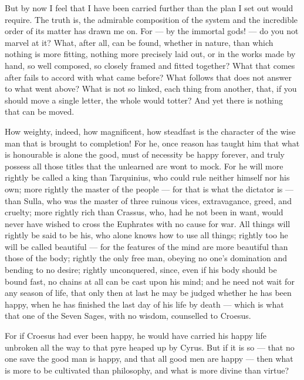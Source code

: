  But by now I feel that I have been carried further than the plan I set out would require. The truth is, the admirable composition of the system and the incredible order of its matter has drawn me on. For — by the immortal gods! — do you not marvel at it? What, after all, can be found, whether in nature, than which nothing is more fitting, nothing more precisely laid out, or in the works made by hand, so well composed, so closely framed and fitted together? What that comes after fails to accord with what came before? What follows that does not answer to what went above? What is not so linked, each thing from another, that, if you should move a single letter, the whole would totter? And yet there is nothing that can be moved.

 How weighty, indeed, how magnificent, how steadfast is the character of the wise man that is brought to completion! For he, once reason has taught him that what is honourable is alone the good, must of necessity be happy forever, and truly possess all those titles that the unlearned are wont to mock. For he will more rightly be called a king than Tarquinius, who could rule neither himself nor his own; more rightly the master of the people — for that is what the dictator is — than Sulla, who was the master of three ruinous vices, extravagance, greed, and cruelty; more rightly rich than Crassus, who, had he not been in want, would never have wished to cross the Euphrates with no cause for war. All things will rightly be said to be his, who alone knows how to use all things; rightly too he will be called beautiful — for the features of the mind are more beautiful than those of the body; rightly the only free man, obeying no one's domination and bending to no desire; rightly unconquered, since, even if his body should be bound fast, no chains at all can be cast upon his mind; and he need not wait for any season of life, that only then at last he may be judged whether he has been happy, when he has finished the last day of his life by death — which is what that one of the Seven Sages, with no wisdom, counselled to Croesus.

 For if Croesus had ever been happy, he would have carried his happy life unbroken all the way to that pyre heaped up by Cyrus. But if it is so — that no one save the good man is happy, and that all good men are happy — then what is more to be cultivated than philosophy, and what is more divine than virtue?


